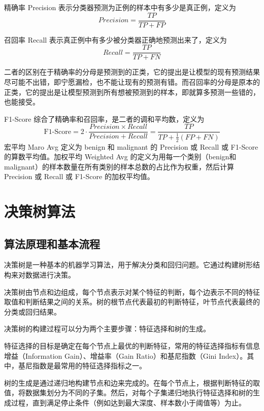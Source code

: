 \documentclass[a4paper,12pt,onecolumn,oneside]{article}
\begin{document}
精确率 Precision 表示分类器预测为正例的样本中有多少是真正例，定义为
\begin{equation*}
	Precision = \frac{TP}{TP + FP}
\end{equation*}
\par 召回率 Recall 表示真正例中有多少被分类器正确地预测出来了，定义为
\begin{equation*}
	Recall = \frac{TP}{TP + FN}
\end{equation*}
\par 二者的区别在于精确率的分母是预测到的正类，它的提出是让模型的现有预测结果尽可能不出错，即宁愿漏检，也不能让现有的预测有错。而召回率的分母是原本的正类，它的提出是让模型预测到所有想被预测到的样本，即就算多预测一些错的，也能接受。\par
F1-Score 综合了精确率和召回率，是二者的调和平均数，定义为
\begin{equation*}
	\text{F1-Score} = 2\cdot\frac{Precision\times Recall}{Precision+Recall} = \frac{TP}{TP+\frac{1}{2}(FP+FN)}
\end{equation*}
宏平均 Maro Avg 定义为 benign 和 malignant 的 Precision 或 Recall 或 F1-Score 的算数平均值。加权平均 Weighted Avg 的定义为用每一个类别（benign和malignant）的样本数量在所有类别的样本总数的占比作为权重，然后计算 Precision 或 Recall 或 F1-Score 的加权平均值。
\clearpage
\section{决策树算法}
\subsection{算法原理和基本流程}
	决策树是一种基本的机器学习算法，用于解决分类和回归问题。它通过构建树形结构来对数据进行决策。

	决策树由节点和边组成，每个节点表示对某个特征的判断，每个边表示不同的特征取值和判断结果之间的关系。树的根节点代表最初的判断特征，叶节点代表最终的分类或回归结果。

	决策树的构建过程可以分为两个主要步骤：特征选择和树的生成。

	特征选择的目标是确定在每个节点上最优的判断特征，常用的特征选择指标有信息增益（Information Gain）、增益率（Gain Ratio）和基尼指数（Gini Index）。其中，基尼指数是最常用的特征选择指标之一。
	
	树的生成是通过递归地构建节点和边来完成的。在每个节点上，根据判断特征的取值，将数据集划分为不同的子集。然后，对每个子集递归地执行特征选择和树的生成过程，直到满足停止条件（例如达到最大深度、样本数小于阈值等）为止。
	
\end{document}
